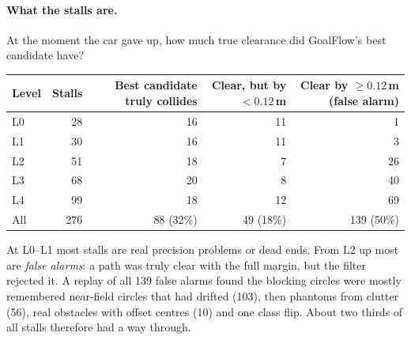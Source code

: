 \documentclass[11pt,a4paper]{article}
\begin{document}
\paragraph{What the stalls are.} At the moment the car gave up, how much true clearance did GoalFlow's best
candidate have?
\begin{table}[H]
\small
\begin{tabular}{@{}lrrrr@{}}
\toprule
Level & Stalls & Best candidate truly collides & Clear, but by $<0.12$\,m & Clear by $\ge0.12$\,m (false alarm) \\
\midrule
L0 & 28 & 16 & 11 & 1 \\
L1 & 30 & 16 & 11 & 3 \\
L2 & 51 & 18 & 7 & 26 \\
L3 & 68 & 20 & 8 & 40 \\
L4 & 99 & 18 & 12 & 69 \\
\midrule
All & 276 & 88 (32\%) & 49 (18\%) & 139 (50\%) \\
\bottomrule
\end{tabular}
\end{table}
At L0--L1 most stalls are real precision problems or dead ends. From L2 up most are \emph{false alarms}: a path
was truly clear with the full margin, but the filter rejected it. A replay of all 139 false alarms found the
blocking circles were mostly remembered near-field circles that had drifted (103), then phantoms from clutter
(56), real obstacles with offset centres (10) and one class flip. About two thirds of all stalls therefore had a
way through.
\end{document}
